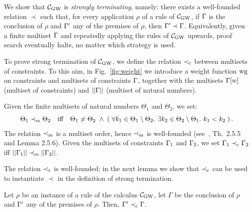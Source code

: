 \noindent
We show that $\mathcal{C}_{\mathrm{GW}}$ is \emph{strongly terminating}, namely: there
exists a well-founded relation $\prec$ such that, for every
application $\rho$ of a rule of $\mathcal{C}_{\mathrm{GW}}$, if $\Gamma$ is the conclusion of
$\rho$ and $\Gamma'$ any of the premises of $\rho$, then $\Gamma'\prec \Gamma$.
Equivalently, given a finite multiset $\Gamma$ and repeatedly applying the
rules of $\mathcal{C}_{\mathrm{GW}}$ upwards, proof search eventually halts, no matter
which strategy is used.

To prove strong termination of $\mathcal{C}_{\mathrm{GW}}$, we define the relation
$\prec_{\mathrm{c}}$ between multisets of constraints.  To this aim, in
Fig.~\ref{fig:weight} we introduce a weight function $\mathrm{wg}$ on
constraints and multisets of constraints $\Gamma$, together with the
multisets $\Gamma[w]$ (multiset of constraints) and $||\Gamma||$ (multiset
of natural numbers).




Given the finite multisets of natural numbers
$\Theta_1$ and $\Theta_2$,  we set:%
\[
\Theta_1 \prec_{\mathrm{m}} \Theta_2
\quad\mbox{iff}\quad
\Theta_1\neq
\Theta_2 \;\land\; \left(\; \forall k_1 \in \Theta_1\setminus
  \Theta_2.\ \exists k_2\in \Theta_2 \setminus \Theta_1.\ k_1 < k_2
  \;\right).
\]  
The relation $\prec_{\mathrm{m}}$ is a multiset order, hence $\prec_{\mathrm{m}}$ is
well-founded (see~\cite{BaaderN:98}, Th.~2.5.5 and Lemma 2.5.6).
Given the multisets of constraints $\Gamma_1$ and $\Gamma_2$,
we set $\Gamma_1 \prec_{\mathrm{c}} \Gamma_2$ iff  $||\Gamma_1|| \prec_{\mathrm{m}}||\Gamma_2||$. 





The relation $\prec_{\mathrm{c}}$ is well-founded;
in the next lemma we show that  $\prec_{\mathrm{c}}$ 
can be used to instantiate $\prec$ in the definition of strong termination.


\begin{lemma}\label{lemma:rulesDec}
  Let $\rho$ be an instance of a rule of the calculus $\mathcal{C}_{\mathrm{GW}}$, let
  $\Gamma$ be the conclusion of $\rho$ and  $\Gamma'$ any of the premises of $\rho$.
  Then,  $\Gamma'\prec_{\mathrm{c}} \Gamma$.
\end{lemma}

